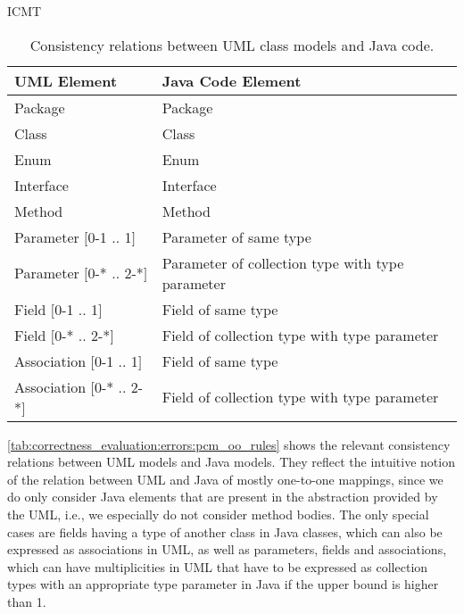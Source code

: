 \begin{copiedFrom}{ICMT}
\begin{table}
	\centering 
    \small
    \renewcommand{\arraystretch}{1.4}
	\begin{tabular}{p{3cm} p{6.8cm}}
		\toprule
        \textbf{\gls{UML} Element}  & \textbf{Java Code Element} \\
        \midrule
        Package                         & Package\\
		Class                           & Class\\
		Enum		                    & Enum \\
		Interface		   	            & Interface \\
        Method                          & Method \\
        Parameter $[$0-1 .. 1$]$        & Parameter of same type \\
        Parameter $[$0-* .. 2-*$]$      & Parameter of collection type with type parameter \\
        Field $[$0-1 .. 1$]$            & Field of same type\\
        Field $[$0-* .. 2-*$]$          & Field of collection type with type parameter\\
        Association $[$0-1 .. 1$]$      & Field of same type\\
        Association $[$0-* .. 2-*$]$    & Field of collection type with type parameter\\
		\bottomrule
	\end{tabular}
	\caption[Consistency relation between UML and Java]{Consistency relations between \gls{UML} class models and Java code.}
	\label{tab:correctness_evaluation:errors:uml_java_rules}
\end{table}

\autoref{tab:correctness_evaluation:errors:pcm_oo_rules} shows the relevant consistency relations between \gls{UML} models and Java models.
They reflect the intuitive notion of the relation between \gls{UML} and Java of mostly one-to-one mappings, since we do only consider Java elements that are present in the abstraction provided by the \gls{UML}, i.e., we especially do not consider method bodies.
The only special cases are fields having a type of another class in Java classes, which can also be expressed as associations in \gls{UML}, as well as parameters, fields and associations, which can have multiplicities in \gls{UML} that have to be expressed as collection types with an appropriate type parameter in Java if the upper bound is higher than 1.


\end{copiedFrom}
